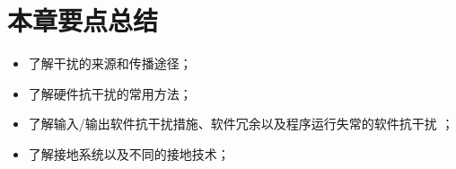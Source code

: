 \section{本章要点总结}

\begin{itemize}

\item 了解干扰的来源和传播途径；
\item 了解硬件抗干扰的常用方法；
\item 了解输入/输出软件抗干扰措施、软件冗余以及程序运行失常的软件抗干扰 ；
\item 了解接地系统以及不同的接地技术；

\end{itemize}
